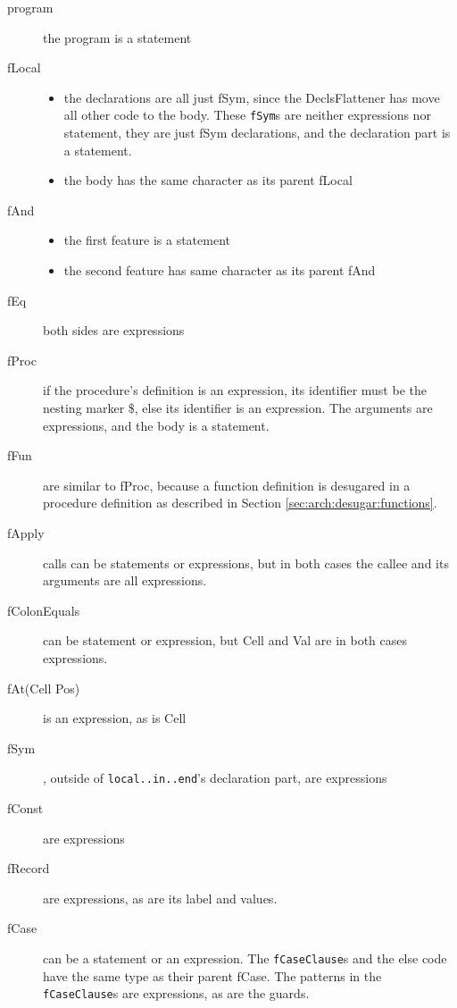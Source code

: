 \documentclass[a4paper]{memoir}
\begin{document}
\begin{description}
  \item[program] the program is a statement
  \item[fLocal] 
    \begin{itemize}
      \item the declarations are all just fSym, since the DeclsFlattener has
        move all other code to the body. These \lstinline!fSym!s are neither expressions nor statement, they are just fSym declarations, and the declaration part is a statement.
      \item the body has the same character as its parent fLocal
    \end{itemize}
  \item[fAnd] 
    \begin{itemize}
      \item the first feature is a statement
      \item the second feature has same character as its parent fAnd
    \end{itemize}
  \item[fEq] both sides are expressions
  \item[fProc] if the procedure's definition is an expression, its identifier must be the nesting marker \$, else its identifier is an expression. The arguments are expressions, and the body is a statement.
  \item[fFun] are similar to fProc, because a function definition is desugared in a procedure definition as described in Section \ref{sec:arch:desugar:functions}.
  \item[fApply] calls can be statements or expressions, but in both cases the callee and its arguments are all expressions. 
  \item[fColonEquals] can be statement or expression, but Cell and Val are in both cases expressions.
  \item[fAt(Cell Pos)] is an expression, as is Cell
  \item[fSym] , outside of \lstinline!local..in..end!'s declaration part, are expressions
  \item[fConst] are expressions
  \item[fRecord] are expressions, as are its label and values.
  \item[fCase] can be a statement or an expression. The \lstinline!fCaseClause!s and the else code have the same type as their parent fCase. The patterns in the \lstinline!fCaseClause!s are expressions, as are the guards.
\end{description}
\end{document}

